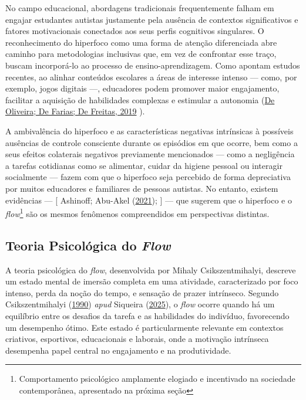 \documentclass[
  12pt,
  a4paper,
]{article}
\begin{document}
No campo educacional, abordagens tradicionais frequentemente falham em
engajar estudantes autistas justamente pela ausência de contextos
significativos e fatores motivacionais conectados aos seus perfis
cognitivos singulares. O reconhecimento do hiperfoco como uma forma de
atenção diferenciada abre caminho para metodologias inclusivas que, em
vez de confrontar esse traço, buscam incorporá-lo ao processo de
ensino-aprendizagem. Como apontam estudos recentes, ao alinhar conteúdos
escolares a áreas de interesse intenso --- como, por exemplo, jogos
digitais ---, educadores podem promover maior engajamento, facilitar a
aquisição de habilidades complexas e estimular a autonomia
(\protect\hyperlink{ref-deOliveira2019}{De Oliveira; De Farias; De
Freitas, 2019} ).

A ambivalência do hiperfoco e as características negativas intrínsicas à
possíveis ausências de controle consciente durante os episódios em que
ocorre, bem como a seus efeitos colaterais negativos previamente
mencionados --- como a negligência a tarefas cotidianas como se
alimentar, cuidar da higiene pessoal ou interagir socialmente --- fazem
com que o hiperfoco seja percebido de forma depreciativa por muitos
educadores e familiares de pessoas autistas. No entanto, existem
evidências --- {[} Ashinoff; Abu-Akel
(\protect\hyperlink{ref-ashinoff2021}{2021}); {]} --- que sugerem que o
hiperfoco e o \emph{flow}\footnote{Comportamento psicológico amplamente
  elogiado e incentivado na sociedade contemporânea, apresentado na
  próxima seção} são os mesmos fenômenos compreendidos em perspectivas
distintas.

\hypertarget{teoria-psicoluxf3gica-do-flow}{%
\subsection{\texorpdfstring{Teoria Psicológica do
\emph{Flow}}{Teoria Psicológica do Flow}}\label{teoria-psicoluxf3gica-do-flow}}

A teoria psicológica do \emph{flow}, desenvolvida por Mihaly
Csikszentmihalyi, descreve um estado mental de imersão completa em uma
atividade, caracterizado por foco intenso, perda da noção do tempo, e
sensação de prazer intrínseco. Segundo Csikszentmihalyi
(\protect\hyperlink{ref-csikszentmihalyi1990}{1990}) \emph{apud}
Siqueira (\protect\hyperlink{ref-siqueira2025}{2025}), o \emph{flow}
ocorre quando há um equilíbrio entre os desafios da tarefa e as
habilidades do indivíduo, favorecendo um desempenho ótimo. Este estado é
particularmente relevante em contextos criativos, esportivos,
educacionais e laborais, onde a motivação intrínseca desempenha papel
central no engajamento e na produtividade.
\end{document}
